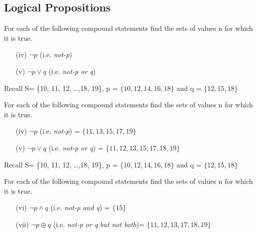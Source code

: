 \documentclass{beamer}
\begin{document}
\begin{frame}

\section{Logical Propositions}

For each of the following compound statements find the sets of values n for which it is true. %
\begin{itemize}
\item[(iv)] $\neg p $  (i.e. \textit{not-p}) %
\item[(v)] $\neg p \vee q$  (i.e. \textit{not-p or q}) %
\end{itemize}
Recall S= \{10, 11, 12, \ldots ,18, 19\}, p = $\{10,12,14,16,18\}$  and q = $\{12,15,18\}$

For each of the following compound statements find the sets of values n for which it is true. %
\begin{itemize}
\item[(iv)] $\neg p $  (i.e. \textit{not-p}) = $\{ 11, 13, 15, 17, 19\}$
\item[(v)] $\neg p \vee q$  (i.e. \textit{not-p or q}) =  $\{11, 12, 13, 15, 17, 18, 19\}$
\end{itemize}

Recall S= \{10, 11, 12, \ldots ,18, 19\}, p = $\{10,12,14,16,18\}$  and q = $\{12,15,18\}$



For each of the following compound statements find the sets of values n for which it is true. 
\begin{itemize}
\item[(vi)] $\neg p \wedge q$ (i.e. \textit{not-p and q}) = $\{15\} $
\item[(vii)] $ \neg p \oplus q$ (i.e. \textit{ not-p or q but not both})= $\{11, 12, 13, 17, 18, 19\}$
\end{itemize}


\end{frame}
\end{document}
